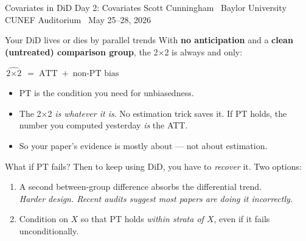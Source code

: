\documentclass[aspectratio=169,11pt]{beamer}
\begin{document}

\codechellatitle
  {Covariates in DiD}
  {Day 2: Covariates}
  {Scott Cunningham \textperiodcentered\ Baylor University}
  {CUNEF Auditorium \textperiodcentered\ May 25--28, 2026}

\begin{frame}{Your DiD lives or dies by parallel trends}
\vspace{0.5em}
With \textbf{no anticipation} and a \textbf{clean (untreated) comparison group}, the 2$\times$2 is always and only:
\vspace{0.3em}
\begin{center}
\Large
$\widehat{\text{2}\times\text{2}} \;=\; \text{ATT} \;+\; \text{non-PT bias}$
\end{center}
\vspace{0.4em}
\begin{itemize}
  \item PT is the  condition you need for unbiasedness.
  \item The 2$\times$2 \textit{is whatever it is}. No estimation trick saves it. If PT holds, the number you computed yesterday \textit{is} the ATT.
  \item So your paper's evidence is mostly about  --- not about estimation.
\end{itemize}
\end{frame}

\begin{frame}{What if PT fails?}
\vspace{0.5em}
Then to keep using DiD, you have to \textit{recover} it. Two options:
\vspace{0.5em}
\begin{enumerate}\setlength\itemsep{0.5em}
  \item {} A second between-group difference absorbs the differential trend. \\
        \textit{Harder design. Recent audits suggest most papers are doing it incorrectly.}
  \item {} Condition on $X$ so that PT holds \textit{within strata of $X$}, even if it fails unconditionally.
\end{enumerate}
\vspace{0.7em}
\end{frame}
\end{document}
